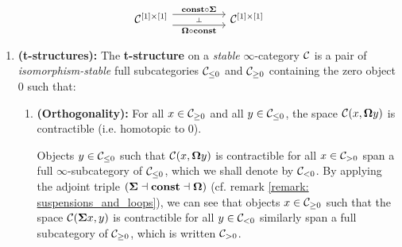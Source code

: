 \begin{remark}
                        $$
                            \begin{tikzcd}
                            	{\C^{[1] \x [1]}} && {\C^{[1] \x [1]}}
                            	\arrow[""{name=0, anchor=center, inner sep=0}, "{\loopspace \circ \const}"', shift right=2, from=1-1, to=1-3]
                            	\arrow[""{name=1, anchor=center, inner sep=0}, "{\const \circ \suspension}", shift left=2, from=1-1, to=1-3]
                            	\arrow["\dashv"{anchor=center, rotate=-90}, draw=none, from=1, to=0]
                            \end{tikzcd}
                        $$
                \end{remark}
            
                \begin{definition}[t-structures] \label{def: t_structures}   
                    \noindent
                    \begin{enumerate}
                        \item \textbf{(t-structures):} The \textbf{t-structure} on a \textit{stable} $\infty$-category $\mathcal{C}$ is a pair of \textit{isomorphism-stable} full subcategories $\mathcal{C}_{\leq 0}$ and $\mathcal{C}_{\geq 0}$ containing the zero object $0$ such that:
                            \begin{enumerate}
                                \item \textbf{(Orthogonality):} For all $x \in \mathcal{C}_{\geq 0}$ and all $y \in \mathcal{C}_{\leq 0}$, the space $\mathcal{C}(x, \mathbf{\Omega} y)$ is contractible (i.e. homotopic to $0$). 
                                
                                Objects $y \in \mathcal{C}_{\leq 0}$ such that $\mathcal{C}(x, \mathbf{\Omega} y)$ is contractible for all $x \in \mathcal{C}_{> 0}$ span a full $\infty$-subcategory of $\mathcal{C}_{\leq 0}$, which we shall denote by $\mathcal{C}_{< 0}$. By applying the adjoint triple $(\mathbf{\Sigma} \dashv \mathbf{const} \dashv \mathbf{\Omega})$ (cf. remark \ref{remark: suspensions_and_loops}), we can see that objects $x \in \mathcal{C}_{\geq 0}$ such that the space $\mathcal{C}(\mathbf{\Sigma} x, y)$ is contractible for all $y \in \mathcal{C}_{< 0}$ similarly span a full subcategory of $\mathcal{C}_{\geq 0}$, which is written $\mathcal{C}_{> 0}$. 
                                

\end{enumerate}
\end{enumerate}
\end{definition}
